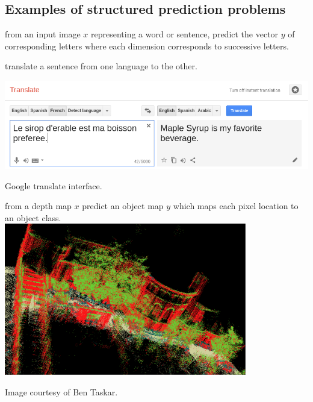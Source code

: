 \newpage
\begin{appendix}
\chapter{Examples of structured prediction problems}

\begin{example}
from an input image $x$ representing a word or sentence, predict the vector $y$
of corresponding letters where each dimension corresponds to successive
letters.  \end{example}

\begin{example}
translate a sentence from one language to the other.

  \centering
    \includegraphics[scale=0.5]{img/googletranslate}
    
Google translate interface.

\end{example}

\begin{example}
from a depth map $x$ predict an object map $y$ which maps each pixel location to an object class.
\\

  \centering
    \includegraphics[scale=0.6]{img/3d}
    
Image courtesy of Ben Taskar.
\end{example}


\end{appendix}
